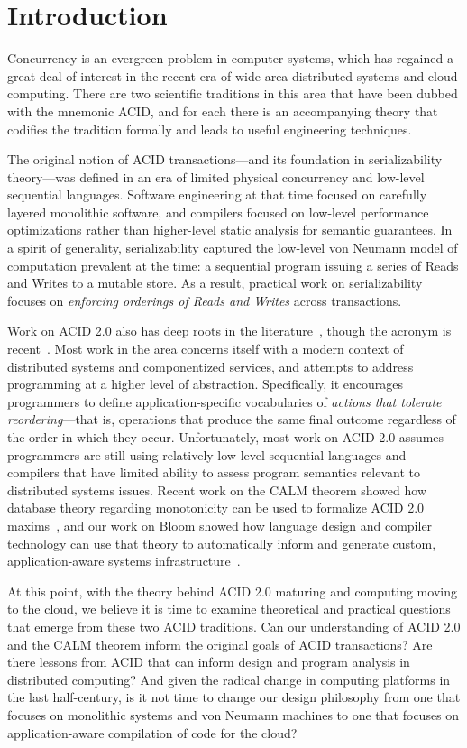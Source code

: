 \documentclass{sig-alternate}
\begin{document}
\section{Introduction}
Concurrency is an evergreen problem in computer systems, which has regained a
great deal of interest in the recent era of wide-area distributed systems and
cloud computing.  There are two scientific traditions in this area that have
been dubbed with the mnemonic \textsf{ACID}, and for each there is an
accompanying theory that codifies the tradition formally and leads to useful
engineering techniques.

The original notion of ACID transactions---and its foundation in serializability theory---was defined in an era of limited physical concurrency and low-level sequential languages.  Software engineering at that time focused on carefully layered monolithic software, and compilers focused on low-level performance optimizations rather than higher-level static analysis for semantic guarantees.  In a spirit of generality, serializability captured the low-level von Neumann model of computation prevalent at the time: a sequential program issuing a series of Reads and Writes to a mutable store.  As a result, practical work on serializability focuses on \emph{enforcing orderings of Reads and Writes} across transactions.

Work on ACID 2.0 also has deep roots in the literature~\cite{fisherpods}, though the acronym is recent~\cite{Helland2009}.  Most work in the area concerns itself with a modern context of distributed systems and componentized services, and attempts to address programming at a higher level of abstraction.  Specifically,  it encourages programmers to define application-specific vocabularies of \emph{actions that tolerate reordering}---that is, operations
that produce the same final outcome regardless of the order in which they occur.  
Unfortunately, most work on ACID 2.0 assumes programmers are still using relatively low-level sequential languages and compilers that have limited ability to assess program semantics relevant to distributed systems issues.  Recent work on the CALM theorem showed how database theory regarding monotonicity can be used to formalize ACID 2.0 maxims~\cite{Alvaro2011,Ameloot2011,Conway2012,Hellerstein2010}, and our work on Bloom showed how language design and compiler technology can use that theory to automatically inform and generate custom, application-aware systems infrastructure~\cite{Alvaro2011}.  

At this point, with the theory behind ACID 2.0 maturing and computing moving to the cloud, we believe it is time to examine theoretical and practical questions that emerge from these two ACID traditions. Can our understanding of ACID 2.0 and the CALM theorem inform the original goals of ACID transactions?  Are there lessons from ACID that can inform design and program analysis in distributed computing?  And given the radical change in computing platforms in the last half-century, is it not time to change our design philosophy from one that focuses on monolithic systems and von Neumann machines to one that focuses on application-aware compilation of code for the cloud?
\end{document}
